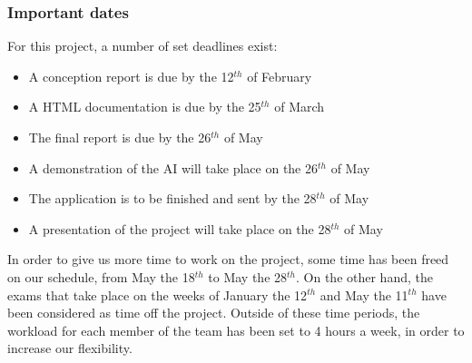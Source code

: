 \subsubsection{Important dates}

For this project, a number of set deadlines exist:
\begin{itemize}
	\item A conception report is due by the 12$^{th}$  of February
	\item A HTML documentation is due by the 25$^{th}$ of March
	\item The final report  is due by the 26$^{th}$ of May
	\item A demonstration of the AI will take place on the 26$^{th}$ of May
	\item The application is to be finished and sent by the 28$^{th}$ of May
	\item A presentation of the project will take place on the 28$^{th}$ of May
\end{itemize}

In order to give us more time to work on the project, some time has been freed on our schedule, from May the 18$^{th}$ to May the 28$^{th}$.
On the other hand, the exams that take place on the weeks of January the 12$^{th}$ and May the 11$^{th}$ have been considered as time off the project. 
Outside of these time periods, the workload for each member of the team has been set to 4 hours a week, in order to increase our flexibility.